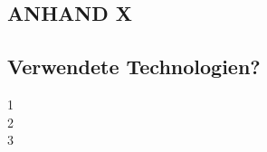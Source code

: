 \subsection{ANHAND X}\label{subsec_UabsAnhang}

\subsection{Verwendete Technologien?}\label{subsec_UabsAnhang}
1
\\
2
\\
3